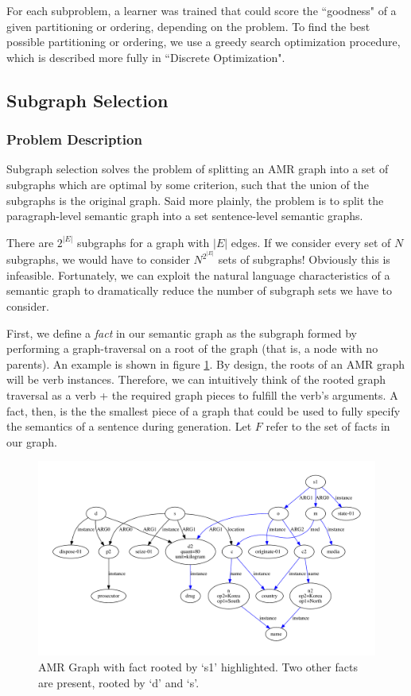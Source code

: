 \documentclass[12pt]{article}
\begin{document}
For each subproblem, a learner was trained that could score the ``goodness" of
a given partitioning or ordering, depending on the problem. To find the best
possible partitioning or ordering, we use a greedy search optimization
procedure, which is described more fully in ``Discrete Optimization".

\subsection{Subgraph Selection}
\subsubsection{Problem Description}

Subgraph selection solves the problem of splitting an AMR graph into a set of
subgraphs which are optimal by some criterion, such that the union of the
subgraphs is the original graph. Said more plainly, the problem is to split the paragraph-level semantic graph 
into a set sentence-level semantic graphs.

There are $2^{|E|}$ subgraphs for a graph with $|E|$ edges. If we consider every set of $N$ subgraphs, we would have to consider $N^{2^{|E|}}$ sets of subgraphs! Obviously this is infeasible. Fortunately, we can exploit the natural language characteristics of a semantic graph to dramatically reduce the number of subgraph sets we have to consider. 

First, we define a {\em fact} in our semantic graph as the subgraph formed by performing a graph-traversal on a root of the graph (that is, a node with no parents). An example is shown in figure \ref{fig:amr_example_3_merged_s1_highlighted}. By design, the roots of an AMR graph will be verb instances. Therefore, we can intuitively think of the rooted graph traversal as a verb + the required graph pieces to fulfill the verb's arguments. A fact, then, is the the smallest piece of a graph that could be used to fully specify the semantics of a sentence during generation. Let $F$ refer to the set of facts in our graph.

\begin{figure}
\includegraphics[width=\linewidth]{amr_example_3_merged_s1_highlighted.pdf}
\caption{AMR Graph with fact rooted by `s1' highlighted. Two other facts are present, rooted by `d' and `s'.}
\label{fig:amr_example_3_merged_s1_highlighted}
\end{figure}
\end{document}
